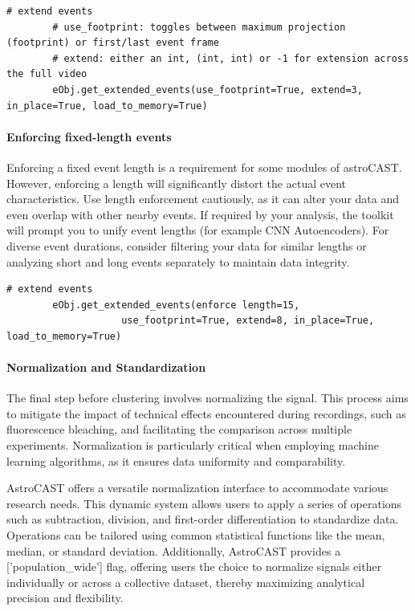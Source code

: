 \documentclass[utf8]{FrontiersinHarvard}
\newcommand{\inlineBash}[1]{%
    \begingroup
    \edef\temp{#1}%
    \expandafter\StrSubstitute\expandafter{\temp}{--}{-{-}}[\temp]%
    \tcbox[on line, boxsep=0pt, left=1pt, right=1pt, top=1pt, bottom=1pt,
        boxrule=0pt, arc=0pt, outer arc=0pt, colback=lightgray]{
        \texttt{\small \temp}
    }%
    \endgroup
}
\newcommand{\inlinepy}[1]{\inlineBash{#1}}
\begin{document}
    \begin{lstlisting}[style=pyStyle]
        # extend events
        # use_footprint: toggles between maximum projection (footprint) or first/last event frame
        # extend: either an int, (int, int) or -1 for extension across the full video
        eObj.get_extended_events(use_footprint=True, extend=3, in_place=True, load_to_memory=True)
    \end{lstlisting}

    \paragraph{Enforcing fixed-length events}
    \label{par:enforcing-length}
    Enforcing a fixed event length is a requirement for some modules of astroCAST. However, enforcing a length will significantly distort the actual event characteristics. Use length enforcement cautiously, as it can alter your data and even overlap with other nearby events. If required by your analysis, the toolkit will prompt you to unify event lengths (for example \ac{CNN} Autoencoders). For diverse event durations, consider filtering your data for similar lengths or analyzing short and long events separately to maintain data integrity.

    \begin{lstlisting}[style=pyStyle]
        # extend events
        eObj.get_extended_events(enforce length=15,
                    use_footprint=True, extend=8, in_place=True, load_to_memory=True)
    \end{lstlisting}

    \paragraph{Normalization and Standardization}
    The final step before clustering involves normalizing the signal. This process aims to mitigate the impact of technical effects encountered during recordings, such as fluorescence bleaching, and facilitating the comparison across multiple experiments. Normalization is particularly critical when employing machine learning algorithms, as it ensures data uniformity and comparability.

    AstroCAST offers a versatile normalization interface to accommodate various research needs. This dynamic system allows users to apply a series of operations such as subtraction, division, and first-order differentiation to standardize data. Operations can be tailored using common statistical functions like the mean, median, or standard deviation. Additionally, AstroCAST provides a \inlinepy{'population\_wide'} flag, offering users the choice to normalize signals either individually or across a collective dataset, thereby maximizing analytical precision and flexibility.
\end{document}
